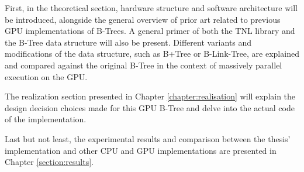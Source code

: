 First, in the theoretical section, hardware structure and software architecture will be introduced, alongside the general overview of prior art related to previous GPU implementations of B-Trees. A general primer of both the TNL library and the B-Tree data structure will also be present. Different variants and modifications of the data structure, such as B+Tree or B-Link-Tree, are explained and compared against the original B-Tree in the context of massively parallel execution on the GPU.

The realization section presented in Chapter \ref{chapter:realisation} will explain the design decision choices made for this GPU B-Tree and delve into the actual code of the implementation.

Last but not least, the experimental results and comparison between the thesis' implementation and other CPU and GPU implementations are presented in Chapter \ref{section:results}.